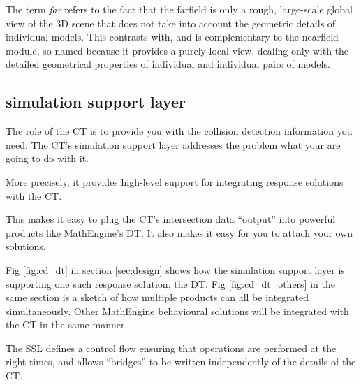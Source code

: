 \documentclass[11pt]{article}
\begin{document}
The term \emph{far} refers to the fact that the farfield is only a rough,
large-scale global view of the 3D scene
that does not take into account
the geometric details of
individual models. 
This contrasts with, and is complementary to the nearfield module, so named
because it provides a purely local view, dealing only with the detailed geometrical properties
of individual and individual pairs of models. 


%
%
%

\subsection{ simulation support layer }

The role of the CT is to provide you with the collision detection
information you need. 
The CT's simulation support layer addresses the problem
what your are going to do with it.

More precisely, it provides high-level support for 
integrating response solutions with the CT.

This makes it easy to plug the CT's intersection data ``output'' into
powerful products like MathEngine's DT.
It also makes it easy for you to attach your own solutions. 

Fig \ref{fig:cd_dt} in section \ref{sec:design} shows how the simulation
support layer is supporting one such response solution, the DT.
Fig \ref{fig:cd_dt_others} in the same section is a sketch of how multiple
products can all be integrated simultaneously. 
Other MathEngine
behavioural solutions will be integrated with the CT in the same manner.

The SSL
defines a control flow ensuring that operations are
performed at the right times, and allows ``bridges'' to be written
independently of the details of the CT.
\end{document}
